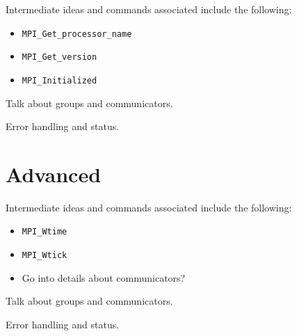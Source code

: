 Intermediate ideas and commands associated include the following: \\
\begin{itemize}
\item \texttt{MPI\_Get\_processor\_name}
\item \texttt{MPI\_Get\_version}
\item \texttt{MPI\_Initialized}
\end{itemize}

Talk about groups and communicators.

Error handling and status.

\section{Advanced}

Intermediate ideas and commands associated include the following: \\
\begin{itemize}
\item \texttt{MPI\_Wtime}
\item \texttt{MPI\_Wtick}
\item Go into details about communicators?
\end{itemize}

Talk about groups and communicators.

Error handling and status.


